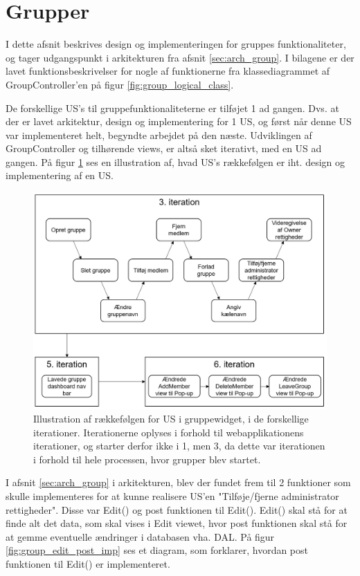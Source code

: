 \section{Grupper}
I dette afsnit beskrives design og implementeringen for gruppes funktionaliteter, og tager udgangspunkt i arkitekturen fra afsnit \ref{sec:arch_group}. I bilagene  er der lavet funktionsbeskrivelser for nogle af funktionerne fra klassediagrammet af GroupController'en på figur \ref{fig:group_logical_class}.

De forskellige US’s til gruppefunktionaliteterne er tilføjet 1 ad gangen. Dvs. at der er lavet arkitektur, design og implementering for 1 US, og først når denne US var implementeret helt, begyndte arbejdet på den næste. Udviklingen af GroupController og tilhørende views, er altså sket iterativt, med en US ad gangen. På figur \ref{fig:group_iterations} ses en illustration af, hvad US's rækkefølgen er iht. design og implementering af en US. 

\begin{figure}[H]
  \includegraphics[width=\linewidth]{01_Billeder/10_Design_og_implementering/Group/GroupIteration.jpg}
  \centering
  \caption{Illustration af rækkefølgen for US i gruppewidget, i de forskellige iterationer. Iterationerne oplyses i forhold til webapplikationens iterationer, og starter derfor ikke i 1, men 3, da dette var iterationen i forhold til hele processen, hvor grupper blev startet.}
  \label{fig:group_iterations}
\end{figure} 

I afsnit \ref{sec:arch_group} i arkitekturen, blev der fundet frem til 2 funktioner som skulle implementeres for at kunne realisere US’en "Tilføje/fjerne administrator rettigheder". Disse var Edit() og post funktionen til Edit(). Edit() skal stå for at finde alt det data, som skal vises i Edit viewet, hvor post funktionen skal stå for at gemme eventuelle ændringer i databasen vha. DAL. På figur \ref{fig:group_edit_post_imp} ses et diagram, som forklarer, hvordan post funktionen til Edit() er implementeret.

